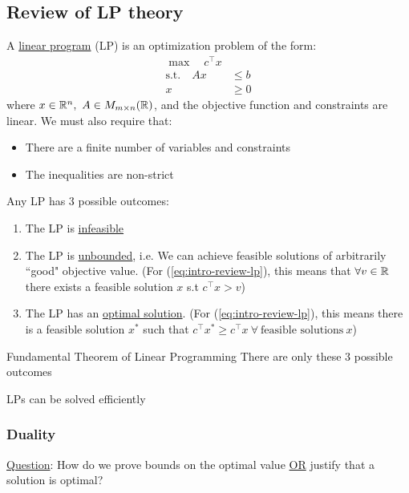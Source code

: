 \subsection{Review of LP theory}
A \underline{linear program} (LP) is an optimization problem of the form:
\begin{equation}\label{eq:intro-review-lp}\tag{P}
\begin{aligned}
    \max \quad c^\intercal x & \\
    \text{s.t.} \quad Ax &\leq b \\
    x &\geq 0
\end{aligned}
\end{equation}
where $x \in \mathbb{R}^n, \ A \in M_{m \times n}(\mathbb{R}) $, and the objective function and constraints are linear. We must also require that:
\begin{itemize}
    \item There are a finite number of variables and constraints
    \item The inequalities are non-strict
\end{itemize}

Any LP has 3 possible outcomes:
\begin{enumerate}
    \item The LP is \underline{infeasible}
    \item The LP is \underline{unbounded}, i.e. We can achieve feasible solutions of arbitrarily ``good" objective value. (For (\ref{eq:intro-review-lp}), this means that $\forall v \in \mathbb{R}$ there exists a feasible solution $x$ s.t $c^\intercal x > v$)
    \item The LP has an \underline{optimal solution}. (For (\ref{eq:intro-review-lp}), this means there is a feasible solution $x^*$ such that $c^\intercal x^* \geq c^\intercal x \ \forall \ \text{feasible solutions} \ x$)
\end{enumerate}

\begin{theorem}{Fundamental Theorem of Linear Programming}{}
    There are only these $3$ possible outcomes
\end{theorem}

\begin{theorem}{}{}
    LPs can be solved efficiently
\end{theorem}

\subsubsection{Duality}
\underline{Question}: How do we prove bounds on the optimal value \underline{OR} justify that a solution is optimal?

